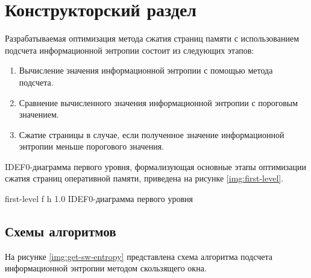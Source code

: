 \chapter{Конструкторский раздел}

Разрабатываемая оптимизация метода сжатия страниц памяти с использованием подсчета информационной энтропии состоит из следующих этапов:

\begin{enumerate}
	\item Вычисление значения информационной энтропии с помощью метода подсчета.
	\item Сравнение вычисленного значения информационной энтропии с пороговым значением.
	\item Сжатие страницы в случае, если полученное значение информационной энтропии меньше порогового значения.
\end{enumerate}

IDEF0-диаграмма первого уровня, формализующая основные этапы оптимизации сжатия страниц оперативной памяти, приведена на рисунке \ref{img:first-level}.
    
    {first-level}
    {f}
    {h}
    {1.0\textwidth}
    {IDEF0-диаграмма первого уровня}

\section{Схемы алгоритмов}

На рисунке \ref{img:get-sw-entropy} представлена схема алгоритма подсчета информационной энтропии методом скользящего окна.

